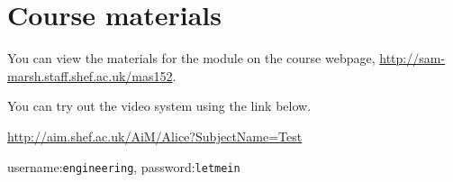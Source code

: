 \documentclass[12pt,envcountsect]{beamer}
\theoremstyle{plain}
\theoremstyle{definition}
\begin{document}
\section{Course materials}

\begin{frame}
You can view the materials for the module on the course webpage, \url{http://sam-marsh.staff.shef.ac.uk/mas152}.

You can try out the video system using the link below.

\url{http://aim.shef.ac.uk/AiM/Alice?SubjectName=Test}

username:\texttt{engineering}, password:\texttt{letmein}
\end{frame}
\end{document}
